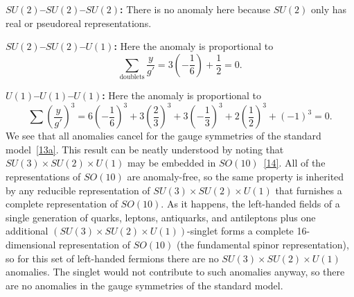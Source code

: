 \noindent\textbf{\boldmath$SU(2)$--$SU(2)$--$SU(2)$:}
There is no anomaly here because $SU(2)$ only has real or pseudoreal
representations.

\noindent\textbf{\boldmath$SU(2)$--$SU(2)$--$U(1)$:}
Here the anomaly is proportional to
\[
 \sum_{\text{doublets}}\frac{y}{g'}
 =3\left(-\frac{1}{6}\right)+\frac{1}{2}=0.
\]

\noindent\textbf{\boldmath$U(1)$--$U(1)$--$U(1)$:}
Here the anomaly is proportional to
\[
 \sum\left(\frac{y}{g'}\right)^3
 =6\left(-\frac{1}{6}\right)^3
 +3\left(\frac{2}{3}\right)^3
 +3\left(-\frac{1}{3}\right)^3
 +2\left(\frac{1}{2}\right)^3
 +(-1)^3=0.
\]
We see that all anomalies cancel for the gauge symmetries of the standard
model~\hyperref[ch22-ref-13a]{[13a]}. This result can be neatly understood
by noting that $SU(3)\times SU(2)\times U(1)$ may be embedded in
$SO(10)$~\hyperref[ch22-ref-14]{[14]}. All of the representations of
$SO(10)$ are anomaly-free, so the same property is inherited by any
reducible representation of $SU(3)\times SU(2)\times U(1)$ that furnishes a
complete representation of $SO(10)$. As it happens, the left-handed fields
of a single generation of quarks, leptons, antiquarks, and antileptons plus
one additional $(SU(3)\times SU(2)\times U(1))$-singlet forms a complete
16-dimensional representation of $SO(10)$ (the fundamental spinor
representation), so for this set of left-handed fermions there are no
$SU(3)\times SU(2)\times U(1)$ anomalies. The singlet would not contribute
to such anomalies anyway, so there are no anomalies in the gauge
symmetries of the standard model.

